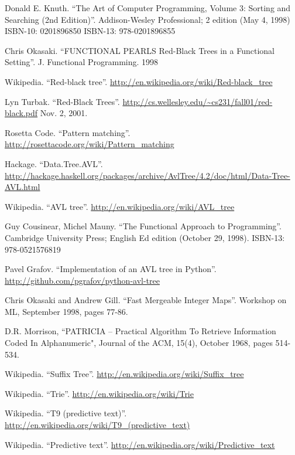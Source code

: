 \begin{thebibliography}{99}
Donald E. Knuth. ``The Art of Computer Programming, Volume 3: Sorting and Searching (2nd Edition)''. Addison-Wesley Professional; 2 edition (May 4, 1998) ISBN-10: 0201896850 ISBN-13: 978-0201896855

Chris Okasaki. ``FUNCTIONAL PEARLS Red-Black Trees in a Functional Setting''. J. Functional Programming. 1998

Wikipedia. ``Red-black tree''. \url{http://en.wikipedia.org/wiki/Red-black_tree}

Lyn Turbak. ``Red-Black Trees''. \url{http://cs.wellesley.edu/~cs231/fall01/red-black.pdf} Nov. 2, 2001.

Rosetta Code. ``Pattern matching''. \url{http://rosettacode.org/wiki/Pattern_matching}

Hackage. ``Data.Tree.AVL''. \url{http://hackage.haskell.org/packages/archive/AvlTree/4.2/doc/html/Data-Tree-AVL.html}

Wikipedia. ``AVL tree''. \url{http://en.wikipedia.org/wiki/AVL_tree}

Guy Cousinear, Michel Mauny. ``The Functional Approach to Programming''. Cambridge University Press; English Ed edition (October 29, 1998). ISBN-13: 978-0521576819

Pavel Grafov. ``Implementation of an AVL tree in Python''. \url{http://github.com/pgrafov/python-avl-tree}


Chris Okasaki and Andrew Gill. ``Fast Mergeable Integer Maps''. Workshop on ML, September 1998, pages 77-86.

D.R. Morrison, ``PATRICIA -- Practical Algorithm To Retrieve  Information Coded In Alphanumeric", Journal of the ACM, 15(4), October 1968, pages 514-534.

Wikipedia. ``Suffix Tree''. \url{http://en.wikipedia.org/wiki/Suffix_tree}

Wikipedia. ``Trie''. \url{http://en.wikipedia.org/wiki/Trie}

Wikipedia. ``T9 (predictive text)''. \url{http://en.wikipedia.org/wiki/T9_(predictive_text)}

Wikipedia. ``Predictive text''. \url{http://en.wikipedia.org/wiki/Predictive_text}


\end{thebibliography}
